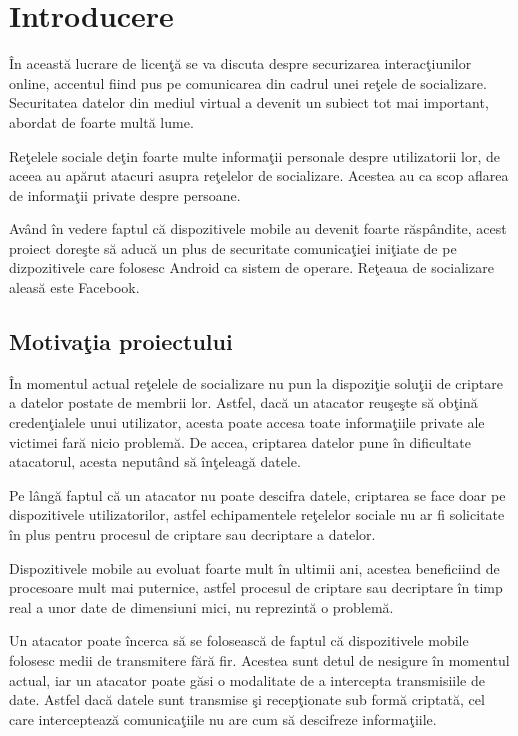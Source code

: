 \chapter{Introducere}
\label{chapter:intro}

\^{I}n aceast\u{a} lucrare de licen\c{t}\u{a} se va discuta despre securizarea interac\c{t}iunilor online, accentul fiind pus pe comunicarea din cadrul unei re\c{t}ele de socializare. Securitatea datelor din mediul virtual a devenit un subiect tot mai important, abordat de foarte mult\u{a} lume.

Re\c{t}elele sociale de\c{t}in foarte multe informa\c{t}ii personale despre utilizatorii lor, de aceea au ap\u{a}rut atacuri asupra re\c{t}elelor de socializare. Acestea au ca scop aflarea de informa\c{t}ii private despre persoane.   

Av\^{a}nd \^{i}n vedere faptul c\u{a} dispozitivele mobile au devenit foarte r\u{a}sp\^{a}ndite, acest proiect dore\c{s}te s\u{a} aduc\u{a} un plus de securitate comunica\c{t}iei ini\c{t}iate de pe dizpozitivele care folosesc Android ca sistem de operare. Re\c{t}eaua de socializare aleas\u{a} este Facebook.  

\section{Motiva\c{t}ia proiectului}
\label{sub-sec:proj-scope}

\^{I}n momentul actual re\c{t}elele de socializare nu pun la dispozi\c{t}ie solu\c{t}ii de criptare a datelor postate de membrii lor. Astfel, dac\u{a} un atacator reu\c{s}e\c{s}te s\u{a} ob\c{t}in\u{a} creden\c{t}ialele unui utilizator, acesta poate accesa toate informa\c{t}iile private ale victimei far\u{a} nicio problem\u{a}. De accea, criptarea datelor pune \^{i}n dificultate atacatorul, acesta neput\^{a}nd s\u{a} \^{i}n\c{t}eleag\u{a} datele.

Pe l\^{a}ng\u{a} faptul c\u{a} un atacator nu poate descifra datele, criptarea se face doar pe dispozitivele utilizatorilor, astfel echipamentele re\c{t}elelor sociale nu ar fi solicitate \^{i}n plus pentru procesul de criptare sau decriptare a datelor.

Dispozitivele mobile au evoluat foarte mult \^{i}n ultimii ani, acestea beneficiind de procesoare mult mai puternice, astfel procesul de criptare sau decriptare \^{i}n timp real a unor date de dimensiuni mici, nu reprezint\u{a} o problem\u{a}.

Un atacator poate \^{i}ncerca s\u{a} se foloseasc\u{a} de faptul c\u{a} dispozitivele mobile folosesc medii de transmitere f\u{a}r\u{a} fir. Acestea sunt detul de nesigure \^{i}n momentul actual, iar un atacator poate g\u{a}si o modalitate de a intercepta transmisiile de date. Astfel dac\u{a} datele sunt transmise \c{s}i recep\c{t}ionate sub form\u{a} criptat\u{a}, cel care intercepteaz\u{a} comunica\c{t}iile nu are cum s\u{a} descifreze informa\c{t}iile.

